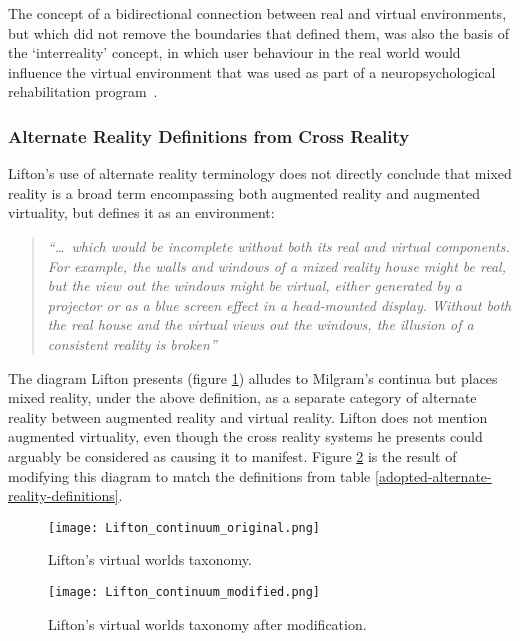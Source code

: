 The concept of a bidirectional connection between real and virtual environments, but which did not remove the boundaries that defined them, was also the basis of the `interreality' concept, in which user behaviour in the real world would influence the virtual environment that was used as part of a neuropsychological rehabilitation program~\cite{Giuseppe2014a}.


\subsubsection{Alternate Reality Definitions from Cross Reality}

Lifton's use of alternate reality terminology does not directly conclude that mixed reality is a broad term encompassing both augmented reality and augmented virtuality, but defines it as an environment:

\begin{quote}
	\textit{``\ldots\ which would be incomplete without both its real and virtual components. For example, the walls and windows of a mixed reality house might be real, but the view out the windows might be virtual, either generated by a projector or as a blue screen effect in a head-mounted display. Without both the real house and the virtual views out the windows, the illusion of a consistent reality is broken''}~\cite{Lifton2007a}
\end{quote}

The diagram Lifton presents (figure \ref{original_lifton_axis.png}) alludes to Milgram's continua but places mixed reality, under the above definition, as a separate category of alternate reality between augmented reality and virtual reality. Lifton does not mention augmented virtuality, even though the cross reality systems he presents could arguably be considered as causing it to manifest. Figure \ref{modified_lifton_axis.png} is the result of modifying this diagram to match the definitions from table \ref{adopted-alternate-reality-definitions}.

\begin{figure}[h]
	\centering
	\texttt{[image: Lifton\_continuum\_original.png]}
	\caption{Lifton's virtual worlds taxonomy.}
	\label{original_lifton_axis.png}
\end{figure}

\begin{figure}[h]
	\centering
	\texttt{[image: Lifton\_continuum\_modified.png]}
	\caption{Lifton's virtual worlds taxonomy after modification.}
	\label{modified_lifton_axis.png}
\end{figure}

